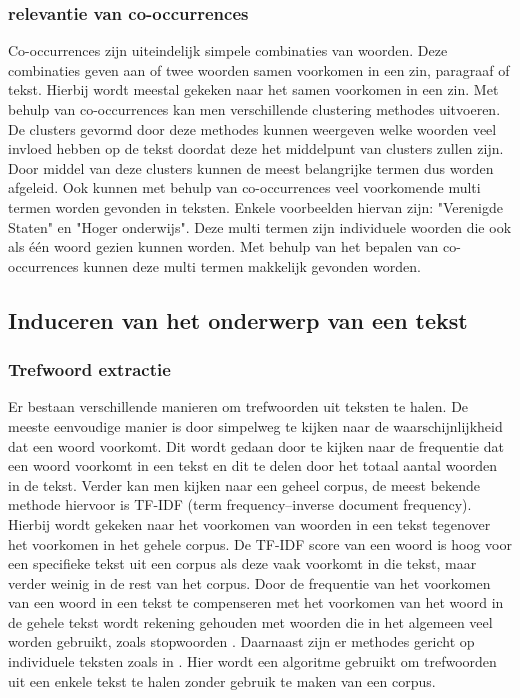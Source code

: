 \subsubsection{relevantie van co-occurrences}
Co-occurrences zijn uiteindelijk simpele combinaties van woorden. Deze combinaties geven aan of twee woorden samen voorkomen in een zin, paragraaf of tekst. Hierbij wordt meestal gekeken naar het samen voorkomen in een zin. Met behulp van co-occurrences kan men verschillende clustering methodes uitvoeren. De clusters gevormd door deze methodes kunnen weergeven welke woorden veel invloed hebben op de tekst doordat deze het middelpunt van clusters zullen zijn. Door middel van deze clusters kunnen de meest belangrijke termen dus worden afgeleid. Ook kunnen met behulp van co-occurrences veel voorkomende multi termen worden gevonden in teksten. Enkele voorbeelden hiervan zijn: "Verenigde Staten" en "Hoger onderwijs". Deze multi termen zijn individuele woorden die ook als één woord gezien kunnen worden. Met behulp van het bepalen van co-occurrences kunnen deze multi termen makkelijk gevonden worden. 

\subsection{Induceren van het onderwerp van een tekst}
\subsubsection{Trefwoord extractie}
Er bestaan verschillende manieren om trefwoorden uit teksten te halen. De meeste eenvoudige manier is door simpelweg te kijken naar de waarschijnlijkheid  dat een woord voorkomt. Dit wordt gedaan door te kijken naar de frequentie dat een woord voorkomt in een tekst en dit te delen door het totaal aantal woorden in de tekst. Verder kan men kijken naar een geheel corpus, de meest bekende methode hiervoor is TF-IDF (term frequency–inverse document frequency)\citep{ramos2003using}. Hierbij wordt gekeken naar het voorkomen van woorden in een tekst tegenover het voorkomen in het gehele corpus. De TF-IDF score van een woord is hoog voor een specifieke tekst uit een corpus als deze vaak voorkomt in die tekst, maar verder weinig in de rest van het corpus. Door de frequentie van het voorkomen van een woord in een tekst te compenseren met het voorkomen van het woord in de gehele tekst wordt rekening gehouden met woorden die in het algemeen veel worden gebruikt, zoals stopwoorden \citep{aggarwal2012survey}. 
Daarnaast zijn er methodes gericht op individuele teksten zoals in \cite{matsuo2004keyword}. Hier wordt een algoritme gebruikt om trefwoorden uit een enkele tekst te halen zonder gebruik te maken van een corpus. 

